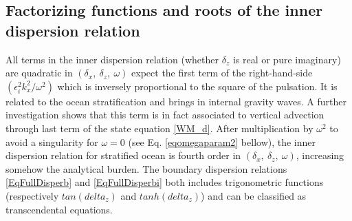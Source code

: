 \documentclass[a4paper,11pt]{article}
\begin{document}
\subsection{Factorizing functions and roots of the inner dispersion relation}
\label{SubSectionFactoDisp}

All terms in the inner dispersion relation (whether $\delta_z$ is real or pure imaginary) are quadratic in $(\delta_x,\ \delta_z,\ \omega)$ expect the first term of the right-hand-side $(\epsilon_i^2k_x^2/\omega^2)$ which is inversely proportional to the square of the pulsation. It is related to the ocean stratification and brings in internal gravity waves. A further investigation shows that this term is in fact associated to vertical advection through last term of the state equation \ref{WM_d}. After multiplication by $\omega^2$ to avoid a singularity for $\omega = 0$ (see Eq. \ref{eqomegaparam2} bellow), the inner dispersion relation for stratified ocean is fourth order in $(\delta_x,\ \delta_z,\ \omega)$, increasing somehow the analytical burden. The boundary dispersion relations \ref{EqFullDisperb} and \ref{EqFullDisperbi} both includes trigonometric functions (respectively $tan(delta_z)$ and $tanh(delta_z)$) and can be classified as transcendental equations.
\end{document}
